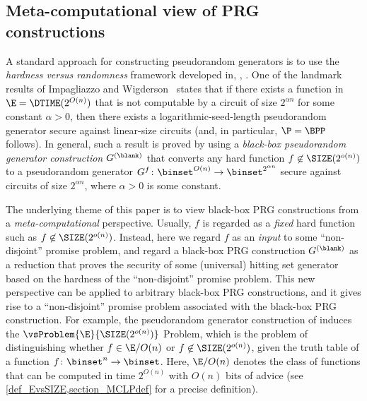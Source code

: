 \documentclass{toc}
\begin{document}
\subsection{Meta-computational view of PRG constructions}
A standard approach for constructing pseudorandom generators
is to use the \emph{hardness versus randomness} framework
developed in, \eg, \cite{Yao82a_focs_conf, BlumM84_siamcomp_journals, NisanW94_jcss_journals, BabaiFNW93_cc_journals, Impagliazzo95_focs_conf, ImpagliazzoW97_stoc_conf, SudanTV01_jcss_journals, KlivansM02_siamcomp_journals}.
One of the landmark results of Impagliazzo and Wigderson~\cite{ImpagliazzoW97_stoc_conf}
states that if there exists a function in $\E = \DTIME(2^{O(n)})$
that is not computable by a circuit of size $2^{\alpha n}$ for some constant $\alpha > 0$,
then there exists a logarithmic-seed-length pseudorandom generator secure against linear-size circuits (and, in particular, $\P = \BPP$ follows).
%
In general,
such a result is proved by using a \emph{black-box pseudorandom generator construction} $G^{(\blank)}$
that converts any hard function $f \not\in \SIZE(2^{o(n)})$ to a pseudorandom generator $G^f \colon \binset^{O(n)} \to \binset^{2^{\alpha n}}$
secure against circuits of size $2^{\alpha n}$,
where $\alpha > 0$ is some constant.
%
%
%
%
%
%
%
%
%
%
%
%
%
%
%
%
%
%
%
%
%
%
%
%
%
%
%
%
%

The underlying theme of this paper is to view black-box PRG constructions from a \emph{meta-computational} perspective.
Usually, $f$ is regarded as a \emph{fixed} hard function such
as $f \not\in \SIZE(2^{o(n)})$.
Instead, here we regard $f$ as an \emph{input} to some ``non-disjoint'' promise problem, and regard a black-box PRG construction $G^{(\blank)}$ as a
reduction
that proves the security of some (universal) hitting set generator
based on the hardness of the ``non-disjoint'' promise problem.
This new perspective can be applied to arbitrary black-box
PRG constructions,
and it gives rise to a ``non-disjoint'' promise problem associated with the black-box PRG construction.
For example, the pseudorandom generator construction of \cite{ImpagliazzoW97_stoc_conf} induces the $\vsProblem{\E}{\SIZE(2^{o(n)})}$ Problem,
which is the problem of distinguishing whether $f \in \E/O(n)$
or $f \not\in \SIZE(2^{o(n)})$,
given the truth table of a function $f \colon \binset^n \to \binset$.
Here, $\E/O(n)$ denotes the class of functions that can be computed in time $2^{O(n)}$ with $O(n)$ bits of advice (see \cref{def_EvsSIZE,section_MCLPdef} for a precise definition).
\end{document}
